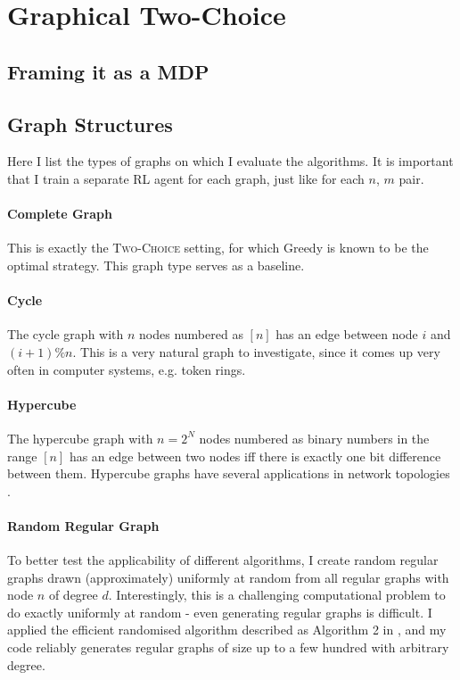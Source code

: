 \section{Graphical Two-Choice}


\subsection{Framing it as a MDP}




\subsection{Graph Structures}


Here I list the types of graphs on which I evaluate the algorithms. It is important that I train a separate RL agent for each graph, just like for each $n$, $m$ pair.


\paragraph{Complete Graph} This is exactly the \textsc{Two-Choice} setting, for which Greedy is known to be the optimal strategy. This graph type serves as a baseline.


\paragraph{Cycle} The cycle graph with $n$ nodes numbered as $[n]$ has an edge between node $i$ and $(i+1)\%n$. This is a very natural graph to investigate, since it comes up very often in computer systems, e.g. token rings.


\paragraph{Hypercube} The hypercube graph with $n=2^N$ nodes numbered as binary numbers in the range $[n]$ has an edge between two nodes iff there is exactly one bit difference between them. Hypercube graphs have several applications in network topologies \cite{ostrouchov1987hypercubenetwork} .


\paragraph{Random Regular Graph} To better test the applicability of different algorithms, I create random regular graphs drawn (approximately) uniformly at random from all regular graphs with node $n$ of degree $d$. Interestingly, this is a challenging computational problem to do exactly uniformly at random - even generating regular graphs is difficult. I applied the efficient randomised algorithm described as Algorithm 2 in \cite{steger1999randomregulargraphs}, and my code reliably generates regular graphs of size up to a few hundred with arbitrary degree.



